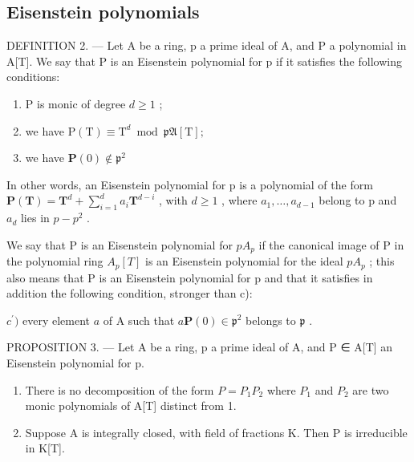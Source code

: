 \subsection{Eisenstein polynomials}

DEFINITION 2. --- Let A be a ring, p a prime ideal of A, and P a polynomial in A{[}T{]}. We say that P is an Eisenstein polynomial for p if it satisfies the following conditions:

\begin{enumerate}
\def\labelenumi{\alph{enumi})}
\item
  P is monic of degree \(d \geqslant 1\) ;
\item
  we have \(\mathrm{P(T)}\equiv \mathrm{T}^d\bmod \mathfrak{pA}[\mathrm{T}];\)
\item
  we have \(\mathbf{P}(0)\notin \mathfrak{p}^2\)
\end{enumerate}

In other words, an Eisenstein polynomial for p is a polynomial of the form \(\mathbf{P}(\mathbf{T}) = \mathbf{T}^{d} + \sum_{i=1}^{d} a_{i} \mathbf{T}^{d-i}\) , with \(d \geqslant 1\) , where \(a_{1}, \ldots, a_{d-1}\) belong to p and \(a_{d}\) lies in \(p - p^{2}\) .

We say that P is an Eisenstein polynomial for \(pA_{p}\) if the canonical image of P in the polynomial ring \(A_{p}[T]\) is an Eisenstein polynomial for the ideal \(pA_{p}\) ; this also means that P is an Eisenstein polynomial for p and that it satisfies in addition the following condition, stronger than c):

\(c^{\prime})\) every element \(a\) of A such that \(a\mathbf{P}(0)\in\mathfrak{p}^{2}\) belongs to \(\mathfrak{p}\) .

PROPOSITION 3. --- Let A be a ring, p a prime ideal of A, and P ∈ A{[}T{]} an Eisenstein polynomial for p.

\begin{enumerate}
\def\labelenumi{\alph{enumi})}
\item
  There is no decomposition of the form \(P = P_{1}P_{2}\) where \(P_{1}\) and \(P_{2}\) are two monic polynomials of A{[}T{]} distinct from 1.
\item
  Suppose A is integrally closed, with field of fractions K. Then P is irreducible in K[T].
\end{enumerate}

